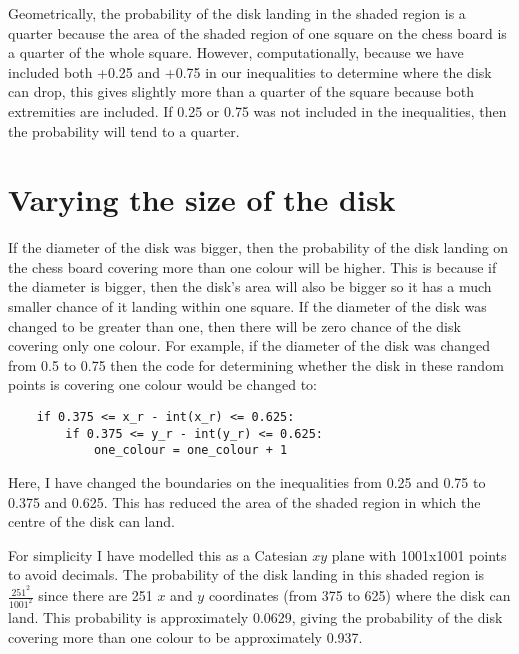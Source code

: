 \documentclass[11pt,a4paper]{amsart}
\theoremstyle{plain}
\theoremstyle{definition}
\theoremstyle{remark}
\begin{document}
Geometrically, the probability of the disk landing in the shaded region is a quarter because the area of the shaded region of one square on the chess board is a quarter of the whole square. However, computationally, because we have included both +0.25 and +0.75 in our inequalities to determine where the disk can drop, this gives slightly more than a quarter of the square because both extremities are included. If 0.25 or 0.75 was not included in the inequalities, then the probability will tend to a quarter.

\section{Varying the size of the disk}
If the diameter of the disk was bigger, then the probability of the disk landing on the chess board covering more than one colour will be higher. This is because if the diameter is bigger, then the disk's area will also be bigger so it has a much smaller chance of it landing within one square. If the diameter of the disk was changed to be greater than one, then there will be zero chance of the disk covering only one colour. For example, if the diameter of the disk was changed from 0.5 to 0.75 then the code for determining whether the disk in these random points is covering one colour would be changed to:
\begin{lstlisting}
    if 0.375 <= x_r - int(x_r) <= 0.625:
        if 0.375 <= y_r - int(y_r) <= 0.625:
            one_colour = one_colour + 1
\end{lstlisting}
Here, I have changed the boundaries on the inequalities from 0.25 and 0.75 to 0.375 and 0.625. This has reduced the area of the shaded region in which the centre of the disk can land.


 For simplicity I have modelled this as a Catesian $xy$ plane with 1001x1001 points to avoid decimals. The probability of the disk landing in this shaded region is $\frac{251^2}{1001^2}$ since there are 251 $x$ and $y$ coordinates (from 375 to 625) where the disk can land. This probability is approximately 0.0629, giving the probability of the disk covering more than one colour to be approximately 0.937.
\end{document}
